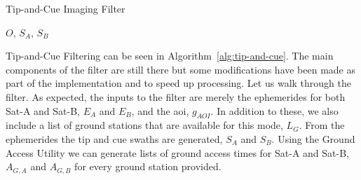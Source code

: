 \begin{algorithm} 
    \caption{Tip-and-Cue Imaging Filter}
    \label{alg:tip-and-cue} 
    \begin{algorithmic}[1] 

	     
	     

	     




		 


		\EndIf

	    \EndFor

	\State \Return $O$, $S_A$, $S_B$
	\EndFunction
    \end{algorithmic}
\end{algorithm}

Tip-and-Cue Filtering can be seen in Algorithm~\ref{alg:tip-and-cue}. The main
components of the filter are still there but some modifications have been made
as part of the implementation and to speed up processing. Let us walk through
the filter. As expected, the inputs to the filter are merely the ephemerides
for both Sat-A and Sat-B, $E_A$ and $E_B$, and the \gls{aoi}, $g_{AOI}$. In
addition to these, we also include a list of ground stations that are available
for this mode, $L_G$. From the ephemerides the tip and cue swaths are
generated, $S_A$ and $S_B$.  Using the Ground Access Utility we can generate
lists of ground access times for Sat-A and Sat-B, $A_{G,A}$ and $A_{G,B}$ for
every ground station provided. 

